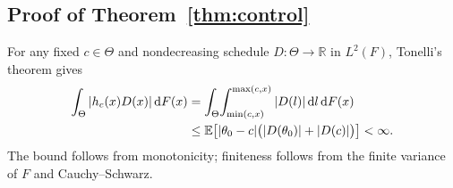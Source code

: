 \documentclass[12pt]{article}
\newcommand{\E}{\mathbb{E}}
\begin{document}
\subsection{Proof of Theorem~\ref{thm:control}}
\label{app:proof-control}
 For any fixed \(c\in\Theta\) and nondecreasing schedule
\(D:\Theta\to\mathbb R\) in \(L^2(F)\), Tonelli's theorem gives
\begin{align}
  \int_\Theta |h_c(x)D(x)|\,\dd F(x)
  &=\int_\Theta\!\int_{\min(c,x)}^{\max(c,x)}
      |D(l)|\,\dd l\,\dd F(x)\notag\\
  &\leq\E\!\left[
      |\theta_0-c|\bigl(|D(\theta_0)|+|D(c)|\bigr)
    \right]<\infty.
  \label{eq:initial-rent-integrability}
\end{align}
The bound follows from monotonicity; finiteness follows from the
finite variance of \(F\) and Cauchy--Schwarz.
\end{document}
